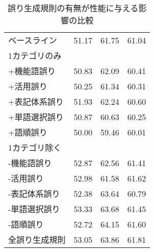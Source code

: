 \documentclass[
  platex, dvipdfmx %
]{nlp2021}
\begin{document}
\begin{table}[t]
	\centering
	\small
	\tabcolsep 6pt
	\caption{誤り生成規則の有無が性能に与える影響の比較}
	\label{tab:ablation}
	\begin{tabular}{lccc}
		\hline
		& \hspace{-1em}{$\def\arraystretch{0.5}\begin{array}{c}\vspace{-0.5em}\\\text{BEA-19}\\\text{valid}\\\end{array}$}\hspace{-1em}
		& \hspace{-1em}{$\def\arraystretch{0.5}\begin{array}{c}\vspace{-0.5em}\\\text{CoNLL}\\\text{14}\\\end{array}$}\hspace{-1em}
		& \hspace{-1em}{$\def\arraystretch{0.5}\begin{array}{c}\vspace{-0.5em}\\\text{JFLEG}\\\text{test}\\\end{array}$}\hspace{-1em}
		\\ \hline
		ベースライン
		& 51.17 & 61.75 & 61.04 \\
		\hline
		\multicolumn{3}{l}{1カテゴリのみ}
		\\
		+機能語誤り
		& 50.83 & 62.09 & 60.41 \\
		+活用誤り
		& 50.25 & 61.34 & 60.31 \\
		+表記体系誤り
		& 51.93 & 62.24 & 60.60 \\
		+単語選択誤り
		& 50.87 & 60.63 & 60.25 \\
		+語順誤り
		& 50.00 & 59.46 & 60.01 \\
		\hline
		\multicolumn{3}{l}{1カテゴリ除く}
		\\
		-機能語誤り
		& 52.87 & 62.56 & 61.41 \\
		-活用誤り
		& 52.98 & 61.58 & 61.62 \\
		-表記体系誤り
		& 52.38 & 63.64 & 60.79 \\
		-単語選択誤り
		& 53.33 & 63.68 & 61.45 \\
		-語順誤り
		& 52.72 & 64.15 & 61.60 \\
		\hline
		全誤り生成規則
		& 53.05 & 63.86 & 61.81 \\
		\hline
	\end{tabular}
\end{table}
\end{document}
